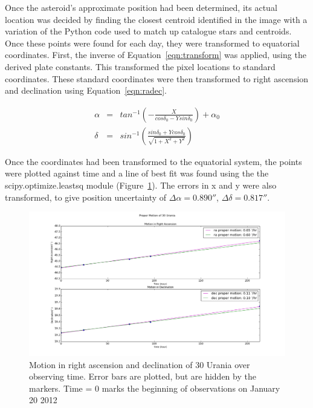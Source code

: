 \documentclass[a4paper,12pt]{article}
\begin{document}
Once the asteroid's approximate position had been determined, its actual location was decided by finding the closest centroid identified in the image with a variation of the Python code used to match up catalogue stars and centroids. Once these points were found for each day, they were transformed to equatorial coordinates. First, the inverse of Equation~\ref{eqn:transform} was applied, using the derived plate constants. This transformed the pixel locations to standard coordinates. These standard coordinates were then transformed to right ascension and declination using Equation~\ref{eqn:radec}.

\begin{equation}
\begin{array}{ccl}
\alpha &=& tan^{-1}\left(-\frac{X}{cos\delta_{0}-Ysin\delta_{0}}\right) + \alpha_{0}\\
\delta &=& sin^{-1}\left(\frac{sin\delta_{0} + Ycos\delta_{0}}{\sqrt{1+X^{2}+Y^{2}}}\right)
\end{array}
\label{eqn:radec}
\end{equation}

Once the coordinates had been transformed to the equatorial system, the points were plotted against time and a line of best fit was found using the the scipy.optimize.leastsq module (Figure~\ref{fig:pm}). The errors in x and y were also transformed, to give position uncertainty of $\Delta\alpha = 0.890''$, $\Delta\delta = 0.817''$.

\begin{figure}[!htbp]
\centering
\includegraphics[scale = 0.35]{proper_motion.png}
\caption{Motion in right ascension and declination of 30 Urania over observing time. Error bars are plotted, but are hidden by the markers. Time = 0 marks the beginning of observations on January 20 2012}
\label{fig:pm}
\end{figure}
\end{document}
